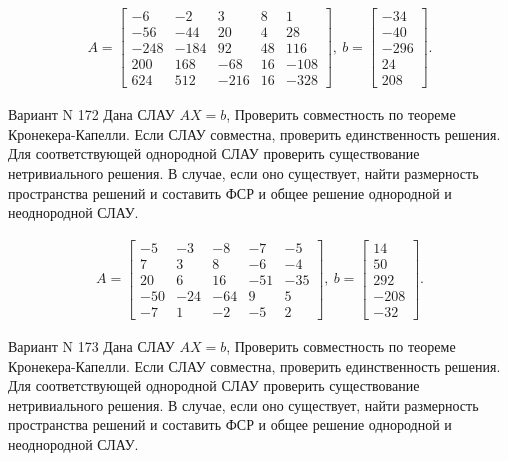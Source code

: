 \documentclass[11pt]{report}
\begin{document}
\begin{align*}
 A = \left[\begin{matrix}-6 & -2 & 3 & 8 & 1\\-56 & -44 & 20 & 4 & 28\\-248 & -184 & 92 & 48 & 116\\200 & 168 & -68 & 16 & -108\\624 & 512 & -216 & 16 & -328\end{matrix}\right],
\ b = \left[\begin{matrix}-34\\-40\\-296\\24\\208\end{matrix}\right]. 
 \end{align*}

Вариант N 172
Дана СЛАУ $AX = b$,
Проверить совместность по теореме Кронекера-Капелли. Если СЛАУ совместна, проверить единственность решения.
Для соответствующей однородной СЛАУ проверить существование нетривиального решения. В случае, если оно существует,
найти размерность пространства решений и составить ФСР и общее решение однородной  и неоднородной СЛАУ.


\begin{align*}
 A = \left[\begin{matrix}-5 & -3 & -8 & -7 & -5\\7 & 3 & 8 & -6 & -4\\20 & 6 & 16 & -51 & -35\\-50 & -24 & -64 & 9 & 5\\-7 & 1 & -2 & -5 & 2\end{matrix}\right],
\ b = \left[\begin{matrix}14\\50\\292\\-208\\-32\end{matrix}\right]. 
 \end{align*}

Вариант N 173
Дана СЛАУ $AX = b$,
Проверить совместность по теореме Кронекера-Капелли. Если СЛАУ совместна, проверить единственность решения.
Для соответствующей однородной СЛАУ проверить существование нетривиального решения. В случае, если оно существует,
найти размерность пространства решений и составить ФСР и общее решение однородной  и неоднородной СЛАУ.
\end{document}
